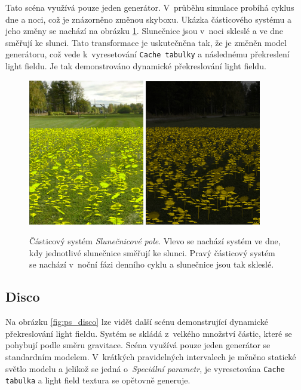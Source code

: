 Tato scéna využívá pouze jeden generátor. V~průběhu simulace probíhá cyklus dne a noci, což je znázorněno změnou skyboxu. Ukázka částicového systému a jeho změny se nachází na obrázku \ref{fig:ps_slunecnice}. Slunečnice jsou v~noci skleslé a ve dne směřují ke slunci. Tato transformace je uskutečněna tak, že je změněn model generátoru, což vede k~vyresetování \texttt{Cache tabulky} a následnému překreslení light fieldu. Je tak demonstrováno dynamické překreslování light fieldu.
\begin{figure}[H]
	\centering
	\includegraphics[width=0.45\textwidth]{obrazky-figures/slunecnice_den.png}
	\includegraphics[width=0.45\textwidth]{obrazky-figures/slunecnice_noc.png}
	\caption{Částicový systém \emph{Slunečnicové pole}. Vlevo se nachází systém ve dne, kdy jednotlivé slunečnice směřují ke slunci. Pravý částicový systém se nachází v~noční fázi denního cyklu a slunečnice jsou tak skleslé. }
	\label{fig:ps_slunecnice}
\end{figure}

\subsection*{Disco}
Na obrázku \ref{fig:ps_disco} lze vidět další scénu demonstrující dynamické překreslování light fieldu. Systém se skládá z~velkého množství částic, které se pohybují podle směru gravitace. Scéna využívá pouze jeden generátor se standardním modelem. V~krátkých pravidelných intervalech je měněno statické světlo modelu a jelikož se jedná o~\emph{Speciální parametr}, je vyresetována \texttt{Cache tabulka} a light field textura se opětovně generuje.

